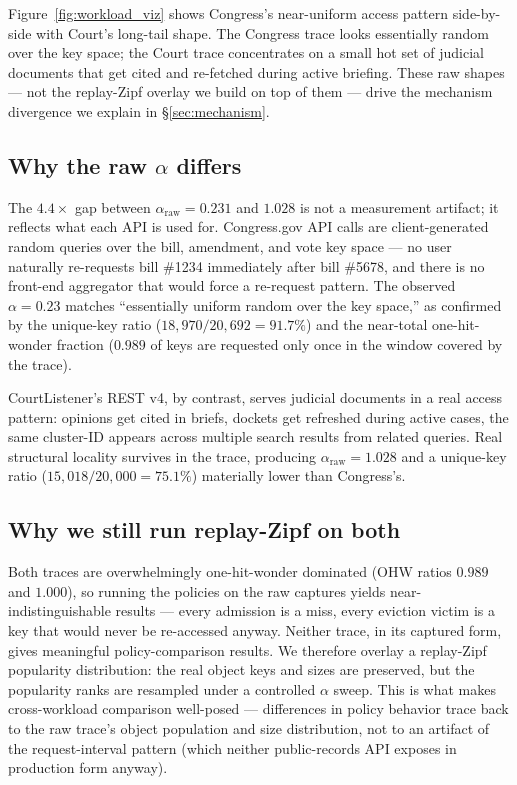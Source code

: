 Figure~\ref{fig:workload_viz} shows Congress's near-uniform access pattern
side-by-side with Court's long-tail shape. The Congress trace looks essentially
random over the key space; the Court trace concentrates on a small hot set of
judicial documents that get cited and re-fetched during active briefing.
These raw shapes --- not the replay-Zipf overlay we build on top of them ---
drive the mechanism divergence we explain in \S\ref{sec:mechanism}.

\subsection*{Why the raw $\alpha$ differs}

The $4.4\times$ gap between $\alpha_{\text{raw}}=0.231$ and $1.028$ is not a
measurement artifact; it reflects what each API is used for. Congress.gov API
calls are client-generated random queries over the bill, amendment, and vote
key space --- no user naturally re-requests bill \#1234 immediately after
bill \#5678, and there is no front-end aggregator that would force a
re-request pattern. The observed $\alpha=0.23$ matches ``essentially uniform
random over the key space,'' as confirmed by the unique-key ratio
($18{,}970/20{,}692 = 91.7\%$) and the near-total one-hit-wonder fraction
($0.989$ of keys are requested only once in the window covered by the trace).

CourtListener's REST v4, by contrast, serves judicial documents in a
real access pattern: opinions get cited in briefs, dockets get refreshed
during active cases, the same cluster-ID appears across multiple search
results from related queries. Real structural locality survives in the
trace, producing $\alpha_{\text{raw}}=1.028$ and a unique-key ratio
($15{,}018/20{,}000 = 75.1\%$) materially lower than Congress's.

\subsection*{Why we still run replay-Zipf on both}

Both traces are overwhelmingly one-hit-wonder dominated (OHW ratios
$0.989$ and $1.000$), so running the policies on the raw captures yields
near-indistinguishable results --- every admission is a miss, every eviction
victim is a key that would never be re-accessed anyway. Neither trace, in
its captured form, gives meaningful policy-comparison results. We therefore
overlay a replay-Zipf popularity distribution: the real object keys and sizes
are preserved, but the popularity ranks are resampled under a controlled
$\alpha$ sweep. This is what makes cross-workload comparison well-posed ---
differences in policy behavior trace back to the raw trace's object
population and size distribution, not to an artifact of the request-interval
pattern (which neither public-records API exposes in production form
anyway).
